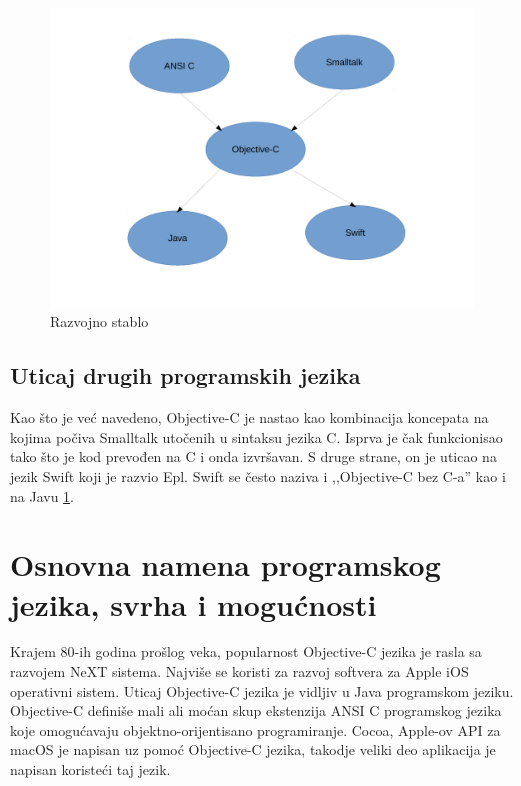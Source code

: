 \documentclass[a4paper]{article}
\begin{document}
\begin{figure}[h!]
	\begin{center}
	\includegraphics[scale=0.4]{razvojno_stablo.pdf}
	\caption{Razvojno stablo}	
	\label{fig:Razvojno_stablo}
	\end{center}
\end{figure}

\subsection{Uticaj drugih programskih jezika}
\label{subsec:uticaj}
Kao što je već navedeno, Objective-C je nastao kao kombinacija koncepata na kojima počiva Smalltalk utočenih u sintaksu jezika C. Isprva je čak funkcionisao tako što je kod prevođen na C i onda izvršavan. S druge strane, on je uticao na jezik Swift koji je razvio Epl. Swift \cite{swift} se često naziva i ,,Objective-C bez C-a'' kao i na Javu \ref{fig:Razvojno_stablo}. 

\section{Osnovna namena programskog jezika, svrha i mogućnosti}
\label{sec:namena}
Krajem 80-ih godina prošlog veka, popularnost Objective-C jezika je rasla sa razvojem NeXT sistema. Najviše se koristi za razvoj softvera za Apple iOS operativni sistem. Uticaj Objective-C jezika je vidljiv u Java programskom jeziku.
Objective-C definiše mali ali moćan skup ekstenzija ANSI C programskog jezika koje omogućavaju objektno-orijentisano programiranje. Cocoa, Apple-ov API za macOS je napisan uz pomoć Objective-C jezika, takodje veliki deo aplikacija je napisan koristeći taj jezik. 
\end{document}
